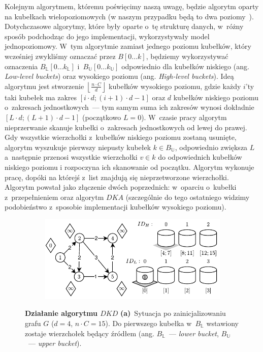 Kolejnym algorytmem, któremu poświęcimy naszą uwagę, będzie algorytm oparty na kubełkach wielopoziomowych (w naszym przypadku będą to dwa poziomy~\cite[$4.2$]{NetOpt}).
Dotychczasowe algorytmy, które były oparte o~tę strukturę danych, w~różny sposób podchodząc do jego implementacji, wykorzystywały model jednopoziomowy.
W~tym algorytmie zamiast jednego poziomu kubełków, który wcześniej zwykliśmy oznaczać przez $B \left[ 0 \dots k \right]$, będziemy wykorzystywać oznaczenia $B_{\mathbb{L}} \left[ 0 \dots k_{\mathbb{L}} \right]$ i~$B_{\mathbb{U}} \left[ 0 \dots k_{\mathbb{U}} \right]$ odpowiednio dla kubełków niskiego (ang. \textit{Low-level buckets}) oraz wysokiego poziomu (ang. \textit{High-level buckets}).
Ideą algorytmu jest stworzenie $\left \lfloor \frac{n \cdot C}{d} \right \rfloor$ kubełków wysokiego poziomu, gdzie każdy $i$'ty taki kubełek ma zakres $\left[ i \cdot d ; \left( i+1 \right) \cdot d - 1\right]$ oraz $d$ kubełków niskiego poziomu o~zakresach jednostkowych~--- tym samym suma ich zakresów wynosi dokładnie $\left[ L \cdot d ; \left( L+1 \right) \cdot d - 1\right]$ (początkowo $L=0$).
W~czasie pracy algorytm nieprzerwanie skanuje kubełki o~zakresach jednostkowych od lewej do prawej.
Gdy wszystkie wierzchołki z~kubełków niskiego poziomu zostaną usunięte, algorytm wyszukuje pierwszy niepusty kubełek $k \in B_{\mathbb{U}}$, odpowiednio zwiększa $L$ a~następnie przenosi wszystkie wierzchołki $v \in k$ do odpowiednich kubełków niskiego poziomu i rozpoczyna ich skanowanie od początku.
Algorytm wykonuje pracę, dopóki na którejś z~list znajdują się nieprzetworzone wierzchołki.
Algorytm powstał jako złączenie dwóch poprzednich: w~oparciu o~kubełki z~przepełnieniem oraz algorytm $DKA$ (szczególnie do tego ostatniego widzimy podobieństwo z~sposobie implementacji kubełków wysokiego poziomu).

\begin{figure}[!htbp]
	\centering
	\null\hfill
	\begin{subfigure}[b]{0.495\textwidth}
		\includegraphics[width=\textwidth]{Chapter_II/DOUBLE-LEVEL-BUCKET-Example/a.pdf}
		\caption{}
		\label{fig:exampleDoubleLevelBuckets:a}
	\end{subfigure}
	\hfill\null
	\caption{
		\textbf{Działanie algorytmu $DKD$}
		\textbf{(a)}~Sytuacja po zainicjalizowaniu grafu $G$ ($d=4$, $n \cdot C = 15$).
		Do pierwszego kubełka w~$B_{\mathbb{L}}$ wstawiony zostaje wierzchołek będący źródłem (ang. $B_{\mathbb{L}}$~--- \textit{lower bucket}, $B_{\mathbb{U}}$~--- \textit{upper bucket}).
	}
	\label{fig:exampleDoubleLevelBucketsA}
\end{figure}
	
